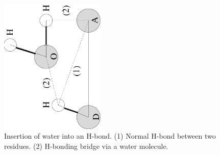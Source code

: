 \begin{figure}
\centerline{
{\includegraphics[width=5cm,angle=270]{plots/hbond_insert}}}
\caption[Insertion of water into an H-bond.]{Insertion of water into
an H-bond. (1) Normal H-bond between two residues. (2) H-bonding
bridge via a water molecule.}
\label{fig:insert}
\end{figure}

